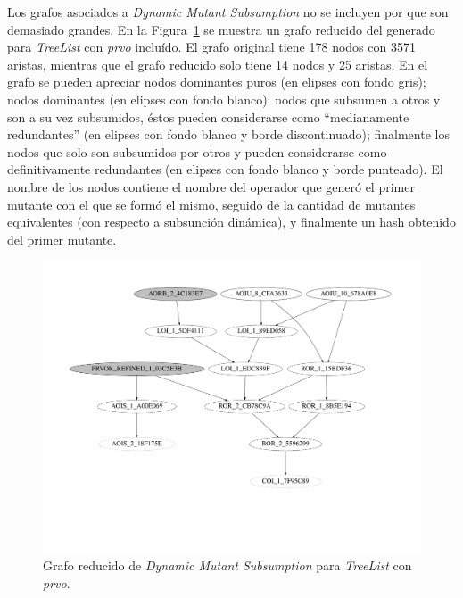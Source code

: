 Los grafos asociados a \emph{Dynamic Mutant Subsumption} no se incluyen por que son demasiado grandes. En la Figura~\ref{figures.examples.subsumption.reducedTreeListGraph} se muestra un grafo reducido del generado para \emph{TreeList} con \emph{prvo} inclu\'ido. El grafo original tiene 178 nodos con 3571 aristas, mientras que el grafo reducido solo tiene 14 nodos y 25 aristas. En el grafo se pueden apreciar nodos dominantes puros (en elipses con fondo gris); nodos dominantes (en elipses con fondo blanco); nodos que subsumen a otros y son a su vez subsumidos, \'estos pueden considerarse como ``medianamente redundantes'' (en elipses con fondo blanco y borde discontinuado); finalmente los nodos que solo son subsumidos por otros y pueden considerarse como definitivamente redundantes (en elipses con fondo blanco y borde punteado). El nombre de los nodos contiene el nombre del operador que gener\'o el primer mutante con el que se form\'o el mismo, seguido de la cantidad de mutantes equivalentes (con respecto a subsunci\'on din\'amica), y finalmente un hash obtenido del primer mutante.

\begin{figure}
	\includegraphics[width=\linewidth]{figures/subsumption/dsg_apache_prvo_segment.pdf}
	\caption{Grafo reducido de \emph{Dynamic Mutant Subsumption} para \emph{TreeList} con \emph{prvo}.}
	\label{figures.examples.subsumption.reducedTreeListGraph}
\end{figure}

